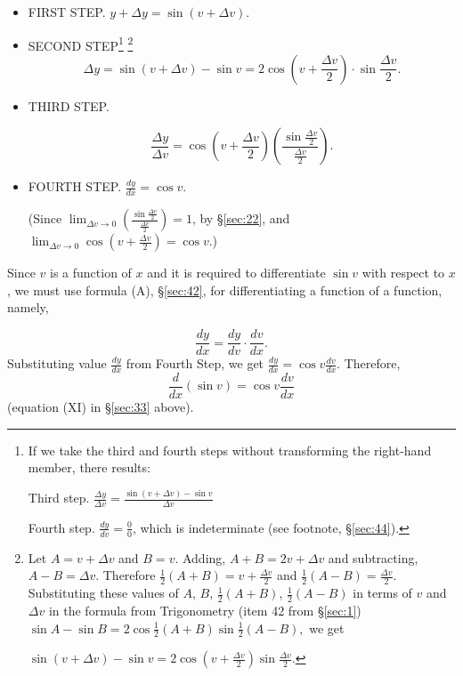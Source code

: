 \begin{itemize}

\item
FIRST STEP. 	$y + \Delta y 	= \sin(v + \Delta v)$.

\item
SECOND STEP\footnote{If we take the third and fourth steps without 
transforming the right-hand member, there results:

Third step. $\frac{\Delta y}{\Delta v} = \frac{\sin(v + \Delta v) - \sin v}{\Delta v}$

Fourth step. $\frac{dy}{dv} = \frac{0}{0}$, which is indeterminate (see footnote, \S \ref{sec:44}).
}
\footnote{Let 	$A 	= v + \Delta v$ %
and 	$B 	= v$. %
Adding, 	$A + B 	= 2v + \Delta v$ and subtracting, $A - B 	= \Delta v$.
Therefore 	$\frac{1}{2}(A + B) 	= v + \frac{\Delta v}{2}$ and 
$\frac{1}{2}(A - B) 	= \frac{\Delta v}{2}$.
Substituting these values of $A$, $B$, $\frac{1}{2}(A + B)$, $\frac{1}{2}(A - B)$ in terms 
of $v$ and $\Delta v$ in the formula from Trigonometry (item 42 from \S \ref{sec:1}) %
$
	\sin A - \sin B 	= 2 \cos \frac{1}{2} (A + B) \sin \frac{1}{2} (A - B),
$
we get 	

$
\sin (v + \Delta v) - \sin v 	= 2 \cos \left ( v + \frac{\Delta v}{2} \right ) \sin \frac{\Delta v}{2}.
$
}
\[
\Delta y 	= \sin(v + \Delta v) - \sin v
  	= 2 \cos \left ( v + \frac{\Delta v}{2} \right ) \cdot \sin \frac{\Delta v}{2}.
\]

\item
THIRD STEP. 	

\[
\frac{\Delta y}{\Delta v} 
= \cos \left ( v + \frac{\Delta v}{2} \right ) \left ( \frac{\sin \frac{\Delta v}{2}}{\frac{\Delta v}{2}} \right ).
\]
\item
FOURTH STEP. $\frac{dy}{dx} 	= \cos v$.

(Since $\lim_{\Delta v \to 0} \left ( \frac{\sin \frac{\Delta v}{2}}{\frac{\Delta v}{2}} \right ) = 1$, 
by \S \ref{sec:22}, %
and $\lim_{\Delta v \to 0} \cos \left ( v + \frac{\Delta v}{2} \right ) = \cos v$.)

\end{itemize}

Since $v$ is a function of $x$ and it is required to differentiate $\sin v$ with respect to $x$, 
we must use formula (A), \S \ref{sec:42}, %
for differentiating a function of a function, namely,

\[
  	\frac{dy}{dx} 	= \frac{dy}{dv} \cdot \frac{dv}{dx}.
\]
Substituting value $\frac{dy}{dx}$ from Fourth Step, we get
$  	\frac{dy}{dx} 	= \cos v \frac{dv}{dx}$.
Therefore, 
\[
\frac{d}{dx} (\sin v) 	= \cos v \frac{dv}{dx}
\]
(equation (XI) in \S \ref{sec:33}  above).

